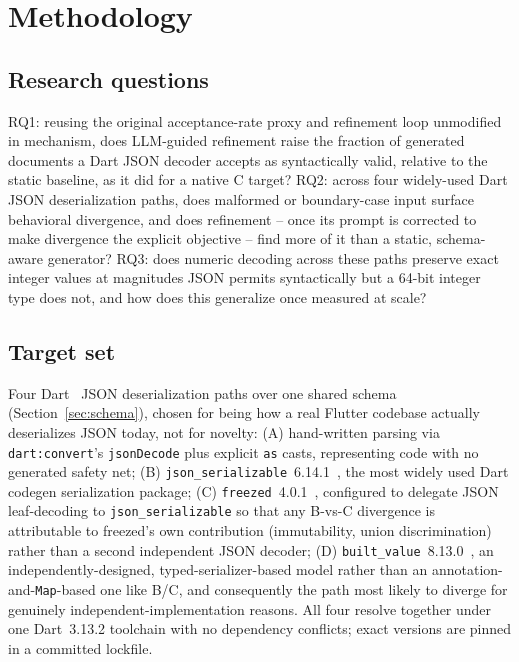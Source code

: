 \section{Methodology}
\label{sec:methodology}

\subsection{Research questions}
RQ1: reusing the original acceptance-rate proxy and refinement loop
unmodified in mechanism, does LLM-guided refinement raise the fraction of
generated documents a Dart JSON decoder accepts as syntactically valid,
relative to the static baseline, as it did for a native C
target? RQ2: across four widely-used Dart JSON deserialization
paths, does malformed or boundary-case input surface behavioral divergence,
and does refinement -- once its prompt is corrected to make divergence the
explicit objective -- find more of it than a static, schema-aware generator?
RQ3: does numeric decoding across these paths preserve exact integer values
at magnitudes JSON permits syntactically but a 64-bit integer type does not,
and how does this generalize once measured at scale?

\subsection{Target set}
\label{sec:target-set}
Four Dart~\cite{dart2026lang} JSON deserialization paths over one shared
schema (Section~\ref{sec:schema}), chosen for being how a real Flutter
codebase actually deserializes JSON today, not for novelty: (A)
hand-written parsing via \texttt{dart:convert}'s \texttt{jsonDecode} plus
explicit \texttt{as} casts, representing code with no generated safety net;
(B) \texttt{json\_serializable}~6.14.1~\cite{jsonserializable2026}, the most
widely used Dart codegen serialization package; (C)
\texttt{freezed}~4.0.1~\cite{freezed2026}, configured to delegate JSON
leaf-decoding to \texttt{json\_serializable} so that any B-vs-C divergence
is attributable to freezed's own contribution (immutability, union
discrimination) rather than a second independent JSON decoder; (D)
\texttt{built\_value}~8.13.0~\cite{builtvalue2026}, an
independently-designed, typed-serializer-based model rather than an
annotation-and-\texttt{Map}-based one like B/C, and consequently the path
most likely to diverge for genuinely independent-implementation reasons.
All four resolve together under one Dart~3.13.2 toolchain with no
dependency conflicts; exact versions are pinned in a committed lockfile.

